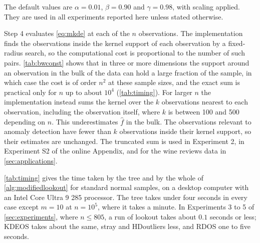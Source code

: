 The default values are $\alpha = 0.01$, $\beta = 0.90$ and $\gamma = 0.98$, with scaling applied. They are used in all experiments reported here unless stated otherwise.

Step 4 evaluates \eqref{eq:mkde} at each of the $n$ observations. The implementation finds the observations inside the kernel support of each observation by a fixed-radius search, so the computational cost is proportional to the number of such pairs. \cref{tab:bwconst} shows that in three or more dimensions the support around an observation in the bulk of the data can hold a large fraction of the sample, in which case the cost is of order $n^2$ at these sample sizes, and the exact sum is practical only for $n$ up to about $10^4$ (\cref{tab:timing}). For larger $n$ the implementation instead sums the kernel over the $k$ observations nearest to each observation, including the observation itself, where $k$ is between 100 and 500 depending on $n$. This underestimates $\hat f$ in the bulk. The observations relevant to anomaly detection have fewer than $k$ observations inside their kernel support, so their estimates are unchanged. The truncated sum is used in Experiment 2, in Experiment S2 of the online Appendix, and for the wine reviews data in \cref{sec:applications}.

\cref{tab:timing} gives the time taken by the tree and by the whole of \cref{alg:modifiedlookout} for standard normal samples, on a desktop computer with an Intel Core Ultra 9 285 processor. The tree takes under four seconds in every case except $m=10$ at $n=10^5$, where it takes a minute. In Experiments 3 to 5 of \cref{sec:experiments}, where $n\le805$, a run of lookout takes about $0.1$ seconds or less; KDEOS takes about the same, stray and HDoutliers less, and RDOS one to five seconds.

\begin{table}[!ht]
  \centering
  \caption{Seconds taken by the minimum spanning tree and by the whole of \cref{alg:modifiedlookout} for standard normal samples in $\R^m$, on a desktop computer with an Intel Core Ultra 9 285 processor. The exact leave-one-out estimate uses a fixed-radius neighbour search and was run for $n\le10^4$, and up to $n=10^5$ in two dimensions; the truncated estimate sums each kernel over at most 500 nearest neighbours.}
  \label{tab:timing}
  
\end{table}
